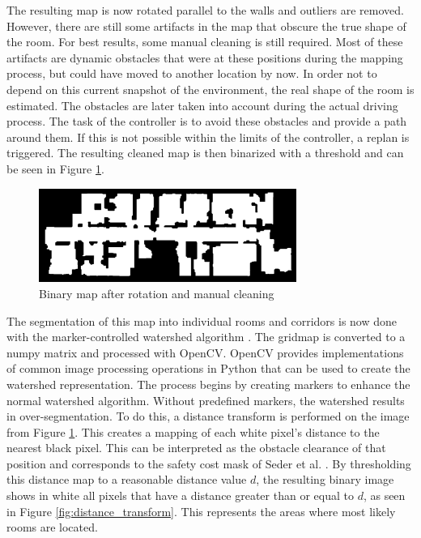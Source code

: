 The resulting map is now rotated parallel to the walls and outliers are removed. However, there are still some artifacts in the map that obscure the true shape of the room. For best results, some manual cleaning is still required. Most of these artifacts are dynamic obstacles that were at these positions during the mapping process, but could have moved to another location by now. In order not to depend on this current snapshot of the environment, the real shape of the room is estimated. The obstacles are later taken into account during the actual driving process. The task of the controller is to avoid these obstacles and provide a path around them. If this is not possible within the limits of the controller, a replan is triggered. The resulting cleaned map is then binarized with a threshold and can be seen in Figure \ref{fig:map_cleaned}.

\begin{figure}[h]
    \centering\captionsetup{justification=centering}
    \includegraphics[width=0.75\textwidth]{figures/50_implementation/ryu.png}
    \caption[Binary map after rotation and manual cleaning]{Binary map after rotation and manual cleaning}
    \label{fig:map_cleaned}
\end{figure}

The segmentation of this map into individual rooms and corridors is now done with the marker-controlled watershed algorithm \cite{parvati_image_2009}. The gridmap is converted to a numpy matrix and processed with OpenCV. OpenCV provides implementations of common image processing operations in Python that can be used to create the watershed representation. The process begins by creating markers to enhance the normal watershed algorithm. Without predefined markers, the watershed results in over-segmentation. To do this, a distance transform is performed on the image from Figure \ref{fig:map_cleaned}. This creates a mapping of each white pixel's distance to the nearest black pixel. This can be interpreted as the obstacle clearance of that position and corresponds to the safety cost mask of Seder et al. \cite{seder_hierarchical_2011}. By thresholding this distance map to a reasonable distance value \(d\), the resulting binary image shows in white all pixels that have a distance greater than or equal to \(d\), as seen in Figure \ref{fig:distance_transform}. This represents the areas where most likely rooms are located. 

